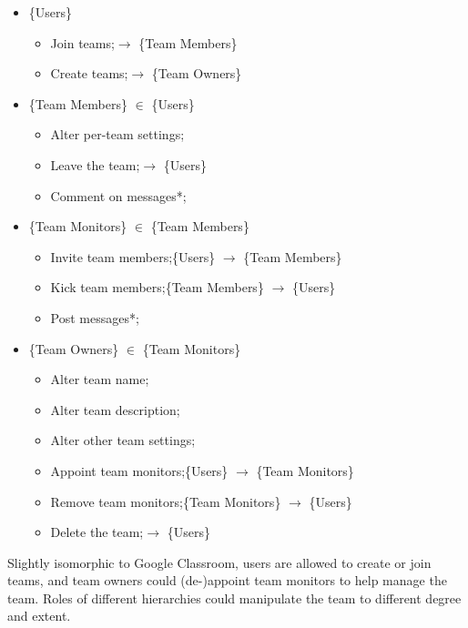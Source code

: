 \documentclass[12pt]{report}
\begin{document}
\begin{itemize}
	\item \{Users\}
	      \begin{itemize}
		      \item Join teams;\null\hfill $\rightarrow$ \{Team Members\}
		      \item Create teams;\null\hfill $\rightarrow$ \{Team Owners\}
	      \end{itemize}
	\item \{Team Members\} $\in$ \{Users\}
	      \begin{itemize}
		      \item Alter per-team settings;
		      \item Leave the team;\null\hfill $\rightarrow$ \{Users\}
		      \item Comment on messages*;
	      \end{itemize}
	\item \{Team Monitors\} $\in$ \{Team Members\}
	      \begin{itemize}
		      \item Invite team members;\null\hfill \{Users\} $\rightarrow$ \{Team Members\}
		      \item Kick team members;\null\hfill \{Team Members\} $\rightarrow$ \{Users\}
		      \item Post messages*;
	      \end{itemize}
	\item \{Team Owners\} $\in$ \{Team Monitors\}
	      \begin{itemize}
		      \item Alter team name;
		      \item Alter team description;
		      \item Alter other team settings;
		      \item Appoint team monitors;\null\hfill \{Users\} $\rightarrow$ \{Team Monitors\}
		      \item Remove team monitors;\null\hfill \{Team Monitors\} $\rightarrow$ \{Users\}
		      \item Delete the team;\null\hfill $\rightarrow$ \{Users\}
	      \end{itemize}
\end{itemize}

Slightly isomorphic to Google Classroom,
users are allowed to create or join teams, and team owners could (de-)appoint team monitors to help manage the team.
Roles of different hierarchies could manipulate the team to different degree and extent.
\vspace{1 em}
\end{document}
